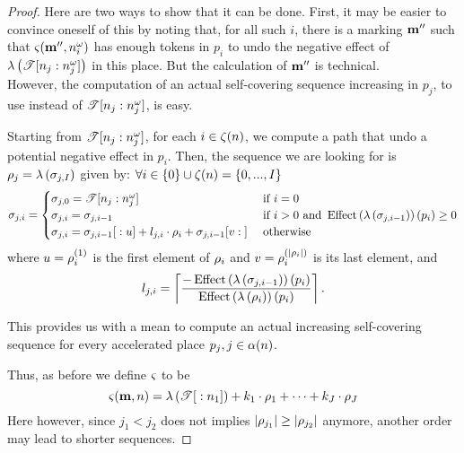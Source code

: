 \begin{proof}
  Here are two ways to show that it can be done.
  First, it may be easier to convince oneself of this by noting that, for all such $i$, there is a marking $\mar''$ such that $\tts{\mar''}{n^\omega_i}$ has enough tokens in $p_i$ to undo the negative effect of $\labt{\treepath[n_j]{n^\omega_j}}$ in this place. But the calculation of $\mar''$ is technical.\\
   However, the computation of an actual self-covering sequence increasing in $p_j$, to use instead of $\treepath[n_j]{ n^\omega_j}$, is easy.

   Starting from $\treepath[n_j]{n^\omega_j}$, for each $i \in \ab{n}$, we compute a path that undo a potential negative effect in $p_i$.
   Then, the sequence we are looking for is $\iscs{j} = \labt{\seqt_{j,I}}$ given by: $\forall i \in \{0\} \cup \ab{n} = \{0, ..., I\}$
  \[
    \seqt_{j,i} =
    \begin{cases}
      \seqt_{j,0} = \treepath[n_j]{n^\omega_j}
        &\text{ if } i = 0 \\
      \seqt_{j,i} = \seqt_{j,i-1}
        &\text{ if } i > 0 \text{ and } \effect{\labt{\seqt_{j,i-1}}}(p_i) \geq 0 \\
      \seqt_{j,i} = \slice[\seqt_{j,i-1}]{}{u} + l_{j,i} \cdot \iscs{i} + \slice[\seqt_{j,i-1}]{v}{}
        &\text{ otherwise}
    \end{cases}
  \]
  where $u = \elem{\iscs{i}}{1}$ is the first element of $\iscs{i}$ and $v = \elem{\iscs{i}}{\card{\iscs{i}}}$ is its last element,
  and
  \[
    l_{j,i} = 
    \left\lceil \frac{-\effect{\labt{\seqt_{j,i-1}}}(p_i)}
                     { \effect{\labt{\iscs{i}}}(p_i)} \right\rceil \text{.}
  \]

  This provides us with a mean to compute an actual increasing self-covering sequence for every accelerated place $p_j, j \in \na{n}$.

  Thus, as before we define $\Tts$ to be
  \[ \tts{\mar}{n} = \labt{\treepath{n_1}} + k_1 \cdot \iscs{1} + \dots + k_J \cdot \iscs{J} \]
  Here however, since $j_1 < j_2$ does not implies $\card{\iscs{j_1}} \geq \card{\iscs{j_2}}$ anymore, another order may lead to shorter sequences.




\end{proof}
